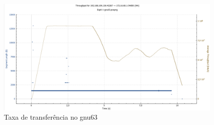 \documentclass[article, a4paper, 11pt, oneside]{memoir}
\begin{document}
\begin{figure}[h]
	\centering
\includegraphics[scale=0.55]{exp6-step5-gnu63-graph.png}
\caption{Taxa de transferência no gnu63}
\end{figure}
\end{document}
